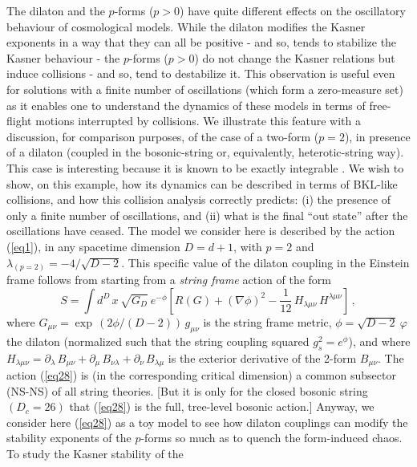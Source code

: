 \documentclass[a4paper,12pt]{article}
\begin{document}
The dilaton  and the $p$-forms ($p>0$) 
have quite different effects on the oscillatory behaviour of
cosmological models. While the dilaton
modifies the Kasner exponents in a way that
they can all be positive - and so, tends to stabilize the
Kasner behaviour -
the $p$-forms ($p>0$) do not change
the Kasner relations but induce collisions - and so, tend to destabilize it.
This observation is useful even for solutions with
a finite number of oscillations (which form a zero-measure set) 
as it enables one to understand
the dynamics of these models in terms of  free-flight motions interrupted
by collisions. 
We illustrate this feature with
a discussion, for comparison purposes, of the case 
of a two-form ($p=2$), in presence of a dilaton (coupled in the 
bosonic-string or, equivalently, heterotic-string way). This case is 
interesting because it is known to be exactly integrable \cite{MV}. We 
wish to show, on this example, how its dynamics can be described in 
terms of BKL-like collisions, and how this collision analysis correctly 
predicts: (i) the presence of only a finite number of oscillations, and 
(ii) what is the final ``out state'' after the oscillations have ceased. 
The model we consider here is described by the
action (\ref{eq1}), in any spacetime 
dimension $D =d+1$, with $p=2$ and $\lambda_{(p=2)} = - 4 / \sqrt{D-2}$. 
This 
specific value of the dilaton coupling in the Einstein frame follows 
from starting from a {\it string frame} action of the form
\begin{equation}
S = \int d^D \, x \, \sqrt{G_D} \ e^{-\phi} \left[ R(G) + (\nabla 
\phi)^2 - \frac{1}{12} \, H_{\lambda \mu \nu} \, H^{\lambda \mu \nu} 
\right]\, , \label{eq28}
\end{equation}
where $G_{\mu \nu} = \exp \, (2 \phi / (D-2)) \, g_{\mu \nu}$ is the 
string 
frame metric, $\phi = \sqrt{D-2} \ \varphi$ the dilaton (normalized 
such that the string coupling squared $g_s^2 = e^{\phi}$), and where 
$H_{\lambda \mu \nu} = \partial_{\lambda} \, B_{\mu \nu} + 
\partial_{\mu} \, B_{\nu \lambda} + \partial_{\nu} \, B_{\lambda \mu}$ 
is the exterior derivative of the 2-form $B_{\mu \nu}$. The action 
(\ref{eq28}) is (in the corresponding critical dimension) a common 
subsector (NS-NS) of all string theories. [But it is only for the 
closed bosonic string $(D_c = 26)$ that (\ref{eq28}) is the full, 
tree-level bosonic action.] 
Anyway, we consider here (\ref{eq28}) as a 
toy model to see how dilaton couplings can modify the stability 
exponents of the $p$-forms so much as 
to quench the form-induced chaos. To study the Kasner stability of the 
\end{document}
